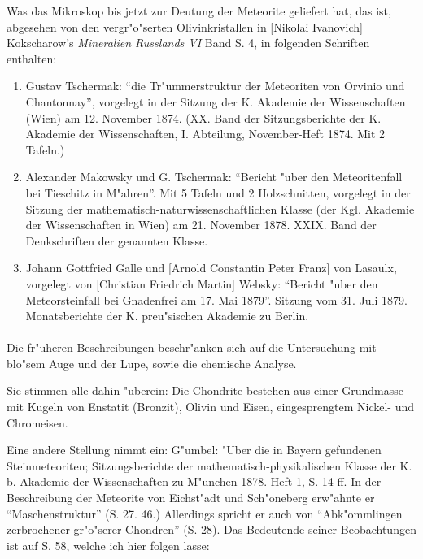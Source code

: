 \documentclass[a4paper, 11pt, oneside]{article}
\begin{document}
Was das Mikroskop bis jetzt zur Deutung der Meteorite geliefert hat, das ist, abgesehen von den vergr"o"serten Olivinkristallen in [Nikolai Ivanovich] Kokscharow's \emph{Mineralien Russlands VI} Band S. 4, in folgenden Schriften enthalten:
\begin{enumerate}
\item Gustav Tschermak: "`die Tr"ummerstruktur der Meteoriten von Orvinio und Chantonnay"', vorgelegt in der Sitzung der K. Akademie der Wissenschaften (Wien) am 12. November 1874. (XX. Band der Sitzungsberichte der K. Akademie der Wissenschaften, I. Abteilung, November-Heft 1874. Mit 2 Tafeln.)
\item Alexander Makowsky und G. Tschermak: "`Bericht "uber den Meteoritenfall bei Tieschitz in M"ahren"'. Mit 5 Tafeln und 2 Holzschnitten, vorgelegt in der Sitzung der mathematisch-naturwissenschaftlichen Klasse (der Kgl. Akademie der Wissenschaften in Wien) am 21. November 1878. XXIX. Band der Denkschriften der genannten Klasse.
\item Johann Gottfried Galle und [Arnold Constantin Peter Franz] von Lasaulx, vorgelegt von [Christian Friedrich Martin] Websky: "`Bericht "uber den Meteorsteinfall bei Gnadenfrei am 17. Mai 1879"'. Sitzung vom 31. Juli 1879. Monatsberichte der K. preu"sischen Akademie zu Berlin.
\end{enumerate}
\paragraph{}
Die fr"uheren Beschreibungen beschr"anken sich auf die Untersuchung mit blo"sem Auge und der Lupe, sowie die chemische Analyse.

Sie stimmen alle dahin "uberein: Die Chondrite bestehen aus einer Grundmasse mit Kugeln von Enstatit (Bronzit), Olivin und Eisen, eingesprengtem Nickel- und Chromeisen.

Eine andere Stellung nimmt ein: G"umbel: "Uber die in Bayern gefundenen Steinmeteoriten; Sitzungsberichte der mathematisch-physikalischen Klasse der K. b. Akademie der Wissenschaften zu M"unchen 1878. Heft 1, S. 14 ff. In der Beschreibung der Meteorite von Eichst"adt und Sch"oneberg erw"ahnte er "`Maschenstruktur"' (S. 27. 46.) Allerdings spricht er auch von "`Abk"ommlingen zerbrochener gr"o"serer Chondren"' (S. 28). Das Bedeutende seiner Beobachtungen ist auf S. 58, welche ich hier folgen lasse:
\end{document}
